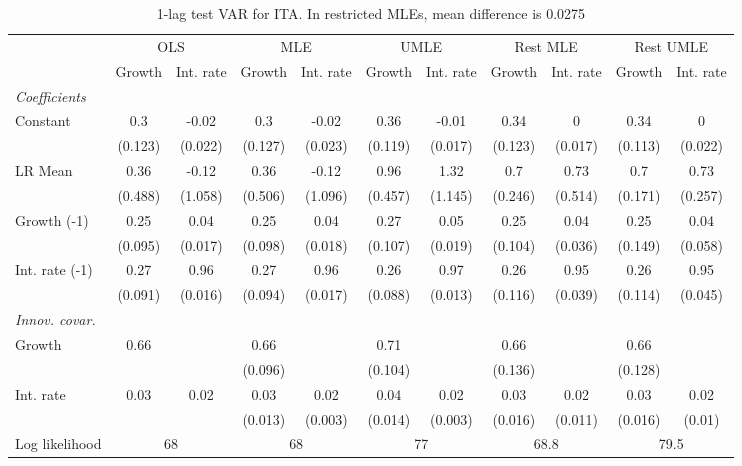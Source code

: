 \begin{table}[htbp] 
	\centering
	\begin{tabular}{@{\extracolsep{4pt}}lcccccccccc@{}}		\hline\hline
		 		 & \multicolumn{2}{c}{OLS} &\multicolumn{2}{c}{MLE} &\multicolumn{2}{c}{UMLE} &\multicolumn{2}{c}{Rest MLE} &\multicolumn{2}{c}{Rest UMLE} \\ 
 		 & Growth 	 & Int. rate 	 & Growth 	 & Int. rate 	 & Growth 	 & Int. rate 	 & Growth 	 & Int. rate 	 & Growth 	 & Int. rate\\\cline{2-3}\cline{4-5}\cline{6-7}\cline{8-9}\cline{10-11}
\rule{0pt}{4ex} 
 \emph{Coefficients} 	  		 & 		 & 		 & 		 & 		 & 		 & 		 & 		 & 		 & 		 &\\ 
\quad Constant 	 & 0.3 	 & -0.02 	 & 0.3 	 & -0.02 	 & 0.36 	 & -0.01 	 & 0.34 	 & 0 	 & 0.34 	 & 0	 \\ 
 		 & (0.123) 	 & (0.022) 	 & (0.127) 	 & (0.023) 	 & (0.119) 	 & (0.017) 	 & (0.123) 	 & (0.017) 	 & (0.113) 	 & (0.022) 	 \\ 
\quad LR Mean 	 & 0.36 	 & -0.12 	 & 0.36 	 & -0.12 	 & 0.96 	 & 1.32 	 & 0.7 	 & 0.73 	 & 0.7 	 & 0.73	 \\ 
 		 & (0.488) 	 & (1.058) 	 & (0.506) 	 & (1.096) 	 & (0.457) 	 & (1.145) 	 & (0.246) 	 & (0.514) 	 & (0.171) 	 & (0.257) 	 \\ 
\quad Growth (-1) 	 &0.25 	 & 0.04 	 & 0.25 	 & 0.04 	 & 0.27 	 & 0.05 	 & 0.25 	 & 0.04 	 & 0.25 	 & 0.04	 \\ 
 		 & (0.095) 	 & (0.017) 	 & (0.098) 	 & (0.018) 	 & (0.107) 	 & (0.019) 	 & (0.104) 	 & (0.036) 	 & (0.149) 	 & (0.058) 	 \\ 
\quad Int. rate (-1) 	 &0.27 	 & 0.96 	 & 0.27 	 & 0.96 	 & 0.26 	 & 0.97 	 & 0.26 	 & 0.95 	 & 0.26 	 & 0.95	 \\ 
 		 & (0.091) 	 & (0.016) 	 & (0.094) 	 & (0.017) 	 & (0.088) 	 & (0.013) 	 & (0.116) 	 & (0.039) 	 & (0.114) 	 & (0.045) 	 \\ 
\rule{0pt}{4ex} \emph{Innov. covar.}  	 & 	 & 	 & 	 & 	 & 	 & 	 & 	 & 	 & 	 &\\ 
\quad Growth 	 &0.66 	 &  	 & 0.66 	 &  	 & 0.71 	 &  	 & 0.66 	 &  	 & 0.66 	 & 	 \\ 
 		 &  	 &  	 & (0.096) 	 &  	 & (0.104) 	 &  	 & (0.136) 	 &  	 & (0.128) 	 &  	 \\ 
\quad Int. rate 	 &0.03 	 & 0.02 	 & 0.03 	 & 0.02 	 & 0.04 	 & 0.02 	 & 0.03 	 & 0.02 	 & 0.03 	 & 0.02	 \\ 
 		 &  	 &  	 & (0.013) 	 & (0.003) 	 & (0.014) 	 & (0.003) 	 & (0.016) 	 & (0.011) 	 & (0.016) 	 & (0.01) 	 \\ 
 \hline \rule{0pt}{4ex} 
  Log likelihood 	 &\multicolumn{2}{c}{68} 	 & \multicolumn{2}{c}{68} 	 & \multicolumn{2}{c}{77} 	 & \multicolumn{2}{c}{68.8} 	 & \multicolumn{2}{c}{79.5}\\ 

 \hline 	\end{tabular}		\caption{1-lag test VAR for ITA. In restricted MLEs, mean difference is 0.0275}
		\label{tab:ITA1lag}

\end{table}